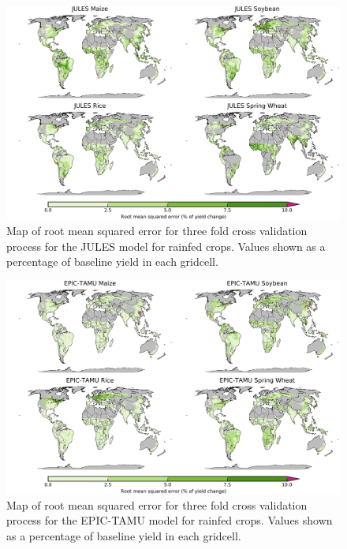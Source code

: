 \documentclass[10pt]{article}
\begin{document}
{{\begin{figure}[h!]
  \centering
  \includegraphics[width=15.5cm]{JULES_spatial_MSE_ton_ha.png}
  \caption{Map of root mean squared error for three fold cross validation process for the JULES model for rainfed crops. Values shown as a percentage of baseline yield in each gridcell.}
\end{figure}

\begin{figure}[h!]
  \centering
  \includegraphics[width=15.5cm]{EPIC-TAMU_spatial_MSE_ton_ha.png}
  \caption{Map of root mean squared error for three fold cross validation process for the EPIC-TAMU model for rainfed crops. Values shown as a percentage of baseline yield in each gridcell.}
\end{figure}

}}
\end{document}
